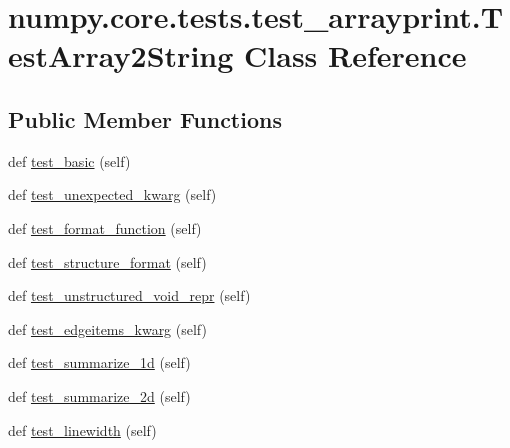 \hypertarget{classnumpy_1_1core_1_1tests_1_1test__arrayprint_1_1TestArray2String}{}\section{numpy.\+core.\+tests.\+test\+\_\+arrayprint.\+Test\+Array2\+String Class Reference}
\label{classnumpy_1_1core_1_1tests_1_1test__arrayprint_1_1TestArray2String}
\subsection*{Public Member Functions}
\begin{DoxyCompactItemize}
\item 
def \hyperlink{classnumpy_1_1core_1_1tests_1_1test__arrayprint_1_1TestArray2String_acef3bd5a31fa3d7d3a1482896cd5bfe2}{test\+\_\+basic} (self)
\item 
def \hyperlink{classnumpy_1_1core_1_1tests_1_1test__arrayprint_1_1TestArray2String_a8ed08a17b19b82933494dc4f4cce9db4}{test\+\_\+unexpected\+\_\+kwarg} (self)
\item 
def \hyperlink{classnumpy_1_1core_1_1tests_1_1test__arrayprint_1_1TestArray2String_ab6ba1688dbf266760f022b1dca048de6}{test\+\_\+format\+\_\+function} (self)
\item 
def \hyperlink{classnumpy_1_1core_1_1tests_1_1test__arrayprint_1_1TestArray2String_a0c5c1c5886c035654bf15d4aaabff1ae}{test\+\_\+structure\+\_\+format} (self)
\item 
def \hyperlink{classnumpy_1_1core_1_1tests_1_1test__arrayprint_1_1TestArray2String_aaa6903a801f2b0037f0c71be692f231b}{test\+\_\+unstructured\+\_\+void\+\_\+repr} (self)
\item 
def \hyperlink{classnumpy_1_1core_1_1tests_1_1test__arrayprint_1_1TestArray2String_af43ac13cb4c800cce3be9fa2858507d1}{test\+\_\+edgeitems\+\_\+kwarg} (self)
\item 
def \hyperlink{classnumpy_1_1core_1_1tests_1_1test__arrayprint_1_1TestArray2String_ab80f39c58f08abbf4908129bfbd832cb}{test\+\_\+summarize\+\_\+1d} (self)
\item 
def \hyperlink{classnumpy_1_1core_1_1tests_1_1test__arrayprint_1_1TestArray2String_a85bc859f8cd1d5b382e90e1cf303cf6d}{test\+\_\+summarize\+\_\+2d} (self)
\item 
def \hyperlink{classnumpy_1_1core_1_1tests_1_1test__arrayprint_1_1TestArray2String_a290bc4dcb2eae1ceae3ad0885e9ca75a}{test\+\_\+linewidth} (self)

\end{DoxyCompactItemize}
